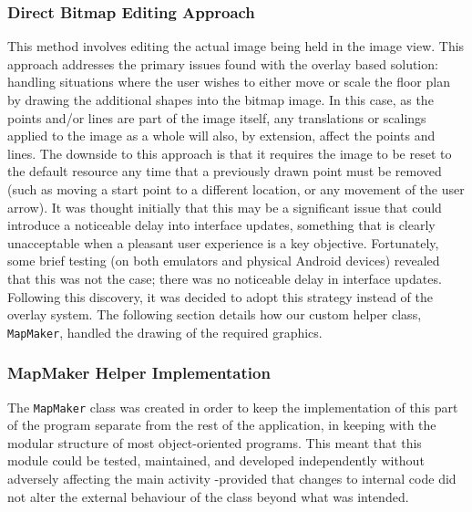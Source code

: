 \documentclass[main.tex]{subfiles}
\begin{document}
                \subsubsection*{Direct Bitmap Editing Approach}
                    This method involves editing the actual image being held in the image view. This approach addresses the primary issues found with the overlay based solution:
                    handling situations where the user wishes to either move or scale the floor plan by drawing the additional shapes into the bitmap image.
                     In this case, as the points and/or lines are part of the image itself, any translations
                    or scalings applied to the image as a whole will also, by extension, affect the points and lines. The downside to this approach is that it requires the image to be reset
                    to the default resource any time that a previously drawn point must be removed (such as moving a start point to a different location, or any movement of the
                    user arrow). It was thought initially that this may be a significant issue that could introduce a noticeable delay into interface updates, something that is clearly
                    unacceptable when a pleasant user experience is a key objective. Fortunately, some brief testing (on both emulators and physical Android devices)
                    revealed that this was not the case; there was no noticeable delay in interface updates. Following this discovery, it was decided to adopt this strategy instead of the
                    overlay system. The following section details how our custom helper class, \texttt{MapMaker}, handled the drawing of the required graphics.
                \subsubsection*{MapMaker Helper Implementation}
                    \label{subsec:MapMaker}
                    The \texttt{MapMaker} class was created in order to keep the implementation of this part of the program separate from the rest of the application, in keeping
                    with the modular structure of most object-oriented programs. This meant that this module could be tested, maintained, and developed independently without 
                    adversely affecting the main activity -provided that changes to internal code did not alter the external behaviour of the class beyond what was intended.
                    
\end{document}
